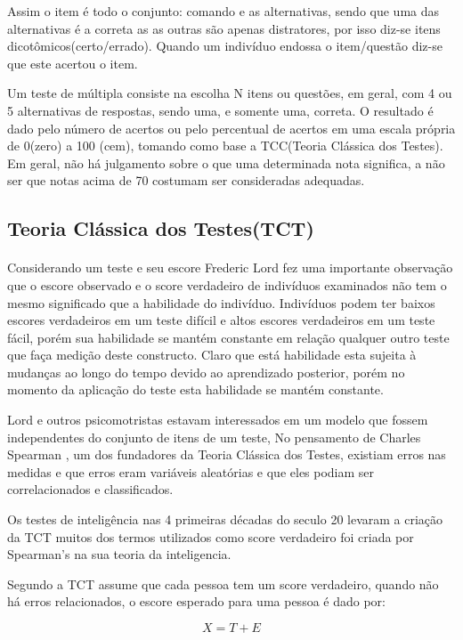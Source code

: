 	\par
	    Assim o item é todo o conjunto: comando e as alternativas, sendo que uma das alternativas é a correta as as outras são apenas distratores, por isso diz-se itens dicotômicos(certo/errado). Quando um indivíduo endossa o item/questão diz-se que este acertou o item.
	 \par
		Um teste de múltipla consiste na escolha N itens ou questões, em geral, com 4 ou 5 alternativas de respostas, sendo uma, e somente uma, correta. O resultado é dado pelo número de acertos ou pelo percentual de acertos em uma escala própria de 0(zero) a 100 (cem), tomando como base a TCC(Teoria Clássica dos Testes). Em geral, não há julgamento sobre o que uma determinada nota significa, a não ser que notas acima de 70 costumam ser consideradas adequadas.\cite{Klein}
	
	\subsection{Teoria Clássica dos Testes(TCT)}
	\paragraph{}
	    Considerando um teste e seu escore Frederic Lord fez uma importante observação que o escore observado e o score verdadeiro de indivíduos examinados não tem o mesmo significado que a habilidade do indivíduo. Indivíduos podem ter baixos escores verdadeiros em um teste difícil e altos escores verdadeiros em um teste fácil, porém sua habilidade se mantém constante em relação qualquer outro teste que faça medição deste constructo. Claro que está habilidade esta sujeita à mudanças ao longo do tempo devido ao aprendizado posterior, porém no momento da aplicação do teste esta habilidade se mantém constante.
	\par
	    Lord e outros psicomotristas estavam interessados em um modelo que fossem independentes do conjunto de itens de um teste, No pensamento de Charles Spearman \cite{Spearman}, um dos fundadores da Teoria Clássica dos Testes, existiam erros nas medidas e que  erros eram variáveis aleatórias e que eles podiam ser correlacionados e classificados.
	\par
		Os testes de inteligência nas 4 primeiras décadas do seculo 20 levaram a criação da TCT\cite{Klein} muitos dos termos utilizados como score verdadeiro foi criada por Spearman's na sua teoria da inteligencia.
	\par
	    Segundo \textcite{Hamblenton} a TCT assume que cada pessoa tem um score verdadeiro, quando não há erros relacionados, o escore esperado para uma pessoa é dado por:
	 \par
	    \begin{equation}
	       X = T + E
	    \end{equation}
